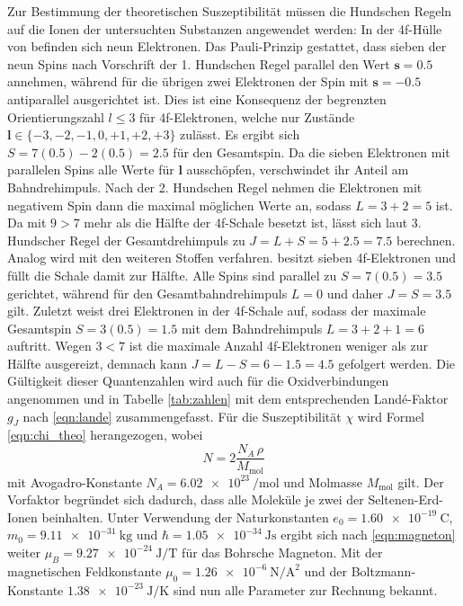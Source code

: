 Zur Bestimmung der theoretischen Suszeptibilität müssen die Hundschen Regeln auf die Ionen der untersuchten Substanzen angewendet
werden: In der 4f-Hülle von  befinden sich neun Elektronen. Das Pauli-Prinzip gestattet, dass sieben der neun Spins
nach Vorschrift der 1. Hundschen Regel parallel den Wert $\symbf s = \num{0.5}$ annehmen, während für die übrigen zwei Elektronen
der Spin mit $\symbf s = \num{-0.5}$ antiparallel ausgerichtet ist. Dies ist eine Konsequenz der begrenzten Orientierungszahl
$l \leq 3$ für 4f-Elektronen, welche nur Zustände $\symbf l \in \{-3,-2,-1,0,+1,+2,+3\}$ zulässt. Es ergibt sich
$S = 7 (\num{0.5}) - 2 (\num{0.5}) = \num{2.5}$ für den Gesamtspin. Da die sieben Elektronen mit parallelen Spins alle Werte
für $\symbf l$ ausschöpfen, verschwindet ihr Anteil am Bahndrehimpuls. Nach der 2. Hundschen Regel nehmen die Elektronen mit
negativem Spin dann die maximal möglichen Werte an, sodass $L = 3 + 2 = 5$ ist. Da mit $9 > 7$ mehr als die Hälfte der 4f-Schale
besetzt ist, lässt sich laut 3. Hundscher Regel der Gesamtdrehimpuls zu $J = L + S = 5 + \num{2.5} = \num{7.5}$ berechnen. Analog
wird mit den weiteren Stoffen verfahren.  besitzt sieben 4f-Elektronen und füllt die Schale damit zur Hälfte. Alle
Spins sind parallel zu $S = 7(\num{0.5}) = \num{3.5}$ gerichtet, während für den Gesamtbahndrehimpuls $L = 0$ und daher
$J = S = \num{3.5}$ gilt. Zuletzt weist  drei Elektronen in der 4f-Schale auf, sodass der maximale Gesamtspin
$S = 3(\num{0.5}) = \num{1.5}$ mit dem Bahndrehimpuls $L = 3 + 2 + 1 = 6$ auftritt. Wegen $3 < 7$ ist die maximale Anzahl 4f-Elektronen
weniger als zur Hälfte ausgereizt, demnach kann $J = L - S = 6 - \num{1.5} = \num{4.5}$ gefolgert werden. Die Gültigkeit dieser
Quantenzahlen wird auch für die Oxidverbindungen angenommen und in Tabelle \ref{tab:zahlen} mit dem entsprechenden Landé-Faktor
$g_J$ nach \eqref{eqn:lande} zusammengefasst. Für die Suszeptibilität $\chi$ wird Formel \eqref{eqn:chi_theo} herangezogen, wobei
\begin{equation*}
	N = 2 \frac{N_{\! A} \, \rho}{M_\text{mol}}
\end{equation*}
mit Avogadro-Konstante $N_{\! A} = \qty{6.02e23}{\per\mole}$ und Molmasse $M_\text{mol}$ gilt. Der Vorfaktor begründet sich dadurch,
dass alle Moleküle je zwei der Seltenen-Erd-Ionen beinhalten. Unter Verwendung der Naturkonstanten
$e_0 = \qty{1.60e-19}{\coulomb}$, $m_0 = \qty{9.11e-31}{\kilo\gram}$ und $\hbar = \qty{1.05e-34}{\joule\second}$ ergibt sich nach
\eqref{eqn:magneton} weiter $\mu_B = \qty{9.27e-24}{\joule\per\tesla}$ für das Bohrsche Magneton. Mit der magnetischen Feldkonstante
$\mu_0 = \qty{1.26e-6}{\newton\per\ampere\squared}$ und der Boltzmann-Konstante $\qty{1.38e-23}{\joule\per\kelvin}$ sind nun
alle Parameter zur Rechnung bekannt.

